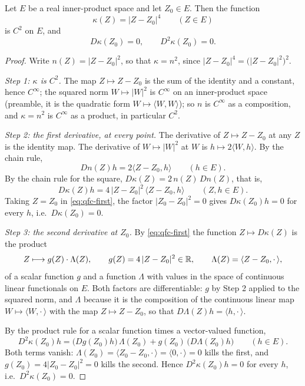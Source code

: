 \begin{lemma}
Let $E$ be a real inner-product space and let $Z_0\in E$. Then the function
\[
  \kappa(Z)=|Z-Z_0|^4\qquad(Z\in E)
\]
is $C^2$ on $E$, and
\[
  D\kappa(Z_0)=0,\qquad D^2\kappa(Z_0)=0 .
\]
\end{lemma}
\begin{proof}
Write $n(Z)=|Z-Z_0|^2$, so that $\kappa=n^2$, since
$|Z-Z_0|^4=\bigl(|Z-Z_0|^2\bigr)^2$.

\emph{Step 1: $\kappa$ is $C^2$.}
The map $Z\mapsto Z-Z_0$ is the sum of the identity and a constant, hence
$C^\infty$; the squared norm $W\mapsto|W|^2$ is $C^\infty$ on an inner-product
space (preamble, it is the quadratic form $W\mapsto\langle W,W\rangle$); so
$n$ is $C^\infty$ as a composition, and $\kappa=n^2$ is $C^\infty$ as a product,
in particular $C^2$.

\emph{Step 2: the first derivative, at every point.}
The derivative of $Z\mapsto Z-Z_0$ at any $Z$ is the identity map. The
derivative of $W\mapsto|W|^2$ at $W$ is $h\mapsto2\langle W,h\rangle$. By the
chain rule,
\[
  Dn(Z)h=2\langle Z-Z_0,h\rangle\qquad(h\in E).
\]
By the chain rule for the square, $D\kappa(Z)=2\,n(Z)\,Dn(Z)$, that is,
\begin{equation}\label{eq:qfc-first}
  D\kappa(Z)h=4\,|Z-Z_0|^2\,\langle Z-Z_0,h\rangle\qquad(Z,h\in E).
\end{equation}
Taking $Z=Z_0$ in \eqref{eq:qfc-first}, the factor $|Z_0-Z_0|^2=0$ gives
$D\kappa(Z_0)h=0$ for every $h$, i.e.\ $D\kappa(Z_0)=0$.

\emph{Step 3: the second derivative at $Z_0$.}
By \eqref{eq:qfc-first} the function $Z\mapsto D\kappa(Z)$ is the product
\[
  Z\longmapsto g(Z)\cdot\Lambda(Z),\qquad
  g(Z)=4\,|Z-Z_0|^2\in\mathbb{R},\qquad
  \Lambda(Z)=\langle Z-Z_0,\cdot\,\rangle,
\]
of a scalar function $g$ and a function $\Lambda$ with values in the space of
continuous linear functionals on $E$. Both factors are differentiable: $g$ by
Step 2 applied to the squared norm, and $\Lambda$ because it is the composition
of the continuous linear map $W\mapsto\langle W,\cdot\,\rangle$ with the map
$Z\mapsto Z-Z_0$, so that $D\Lambda(Z)h=\langle h,\cdot\,\rangle$.

By the product rule for a scalar function times a vector-valued function,
\[
  D^2\kappa(Z_0)h
   =\bigl(Dg(Z_0)h\bigr)\,\Lambda(Z_0)+g(Z_0)\,\bigl(D\Lambda(Z_0)h\bigr)
   \qquad(h\in E).
\]
Both terms vanish: $\Lambda(Z_0)=\langle Z_0-Z_0,\cdot\,\rangle
=\langle0,\cdot\,\rangle=0$ kills the first, and
$g(Z_0)=4|Z_0-Z_0|^2=0$ kills the second. Hence $D^2\kappa(Z_0)h=0$ for every
$h$, i.e.\ $D^2\kappa(Z_0)=0$.
\end{proof}
